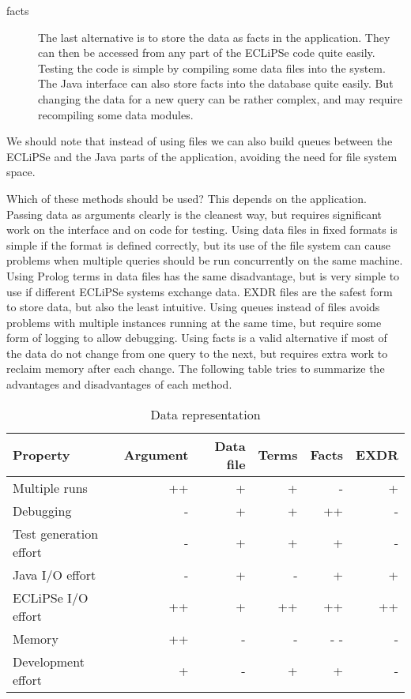 \documentclass[a4paper,12pt]{report}
\begin{document}
\begin{description}
\item[facts] The last alternative is to store the data as facts in the application. They can then be accessed from any part of the ECLiPSe code quite easily. Testing the code is simple by compiling some data files into the system. The Java interface can also store facts into the database quite easily. But changing the data for a new query can be rather complex, and may require recompiling some data modules.

\end{description}

We should note that instead of using files we can also build queues between the ECLiPSe and the Java parts of the application, avoiding the need for file system space.

Which of these methods should be used? This depends on the application. Passing data as arguments clearly is the cleanest way, but requires significant work on the interface and on code for testing. Using data files in fixed formats is simple if the format is defined correctly, but its use of the file system can cause problems when multiple queries should be run concurrently on the same machine. Using Prolog terms in data files has the same disadvantage, but is very simple to use if different ECLiPSe systems exchange data. EXDR files are the safest form to store data, but also the least intuitive. Using queues instead of files avoids problems with multiple instances running at the same time, but require some form of logging to allow debugging. Using facts is a valid alternative if most of the data do not change from one query to the next, but requires extra work to reclaim memory after each change. The following table tries to summarize the advantages and disadvantages of each method.

\begin{table}[htbp]
\begin{tabular}{|l|r|r|r|r|r|}
\hline
Property & Argument & Data file & Terms & Facts & EXDR\\
\hline
Multiple runs& ++ & + & + & - & +\\
\hline
Debugging & - & + & + & ++ & -\\
\hline
Test generation effort & -& + & + & + & -\\
\hline
Java I/O effort & - & + & - & + & +\\
\hline
ECLiPSe I/O effort & ++ & + & ++ & ++ & ++\\
\hline
Memory & ++ & - & -& - - & -\\
\hline
Development effort & + & - & + & + & -\\
\hline
\end{tabular}
\caption{\label{Data representation}Data representation}
\end{table}
\end{document}
